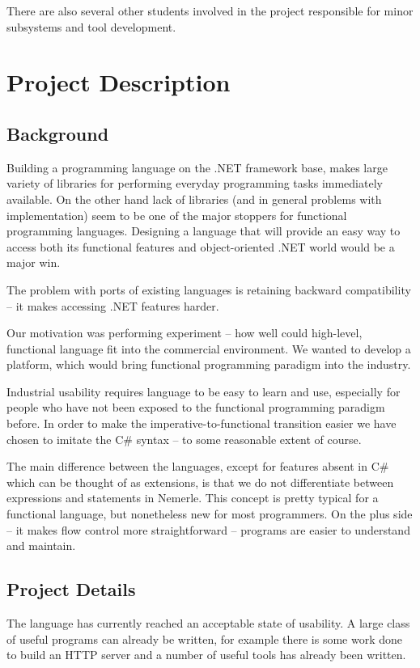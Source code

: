 \documentclass[a4paper,11pt]{article}
\begin{document}
There are also several other students involved in the project
responsible for minor subsystems and tool development.


\section{Project Description}

\subsection{Background}
Building a programming language on the .NET framework base, makes large
variety of libraries for performing everyday programming tasks immediately
available. On the other hand lack of libraries (and in general problems
with implementation) seem to be one of the major stoppers for functional
programming languages. Designing a language that will provide an easy way
to access both its functional features and object-oriented .NET world
would be a major win.

The problem with ports of existing languages is retaining backward
compatibility -- it makes accessing .NET features harder.

Our motivation was performing experiment -- how well could high-level,
functional language fit into the commercial environment. We wanted to
develop a platform, which would bring functional programming paradigm
into the industry.

Industrial usability requires language to be easy to learn and
use, especially for people who have not been exposed to the
functional programming paradigm before.  In order to make the
imperative-to-functional transition easier we have chosen to imitate
the C\# syntax -- to some reasonable extent of course.

The main difference between the languages, except for features absent
in C\# which can be thought of as extensions, is that we do not
differentiate between expressions and statements in Nemerle. This
concept is pretty typical for a functional language, but nonetheless
new for most programmers.  On the plus side -- it makes flow control
more straightforward -- programs are easier to understand and maintain.


\subsection{Project Details}

The language has currently reached an acceptable state of usability.
A large class of useful programs can already be written, for example
there is some work done to build an HTTP server and a number of
useful tools has already been written.
\end{document}
